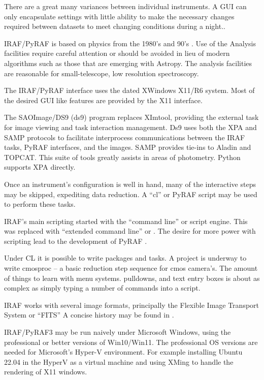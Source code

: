 There are a great many variances between individual instruments. A GUI
can only encapsulate settings with little ability to make the
necessary changes required between datasets to meet changing
conditions during a night..

IRAF/PyRAF is based on physics from the 1980's and
90's \cite{1973asqu.book.....A}. Use of the Analysis facilities require
careful attention or should be avoided in lieu of modern algorithms
such as those that are emerging with Astropy. The analysis facilities
are reasonable for small-telescope, low resolution spectroscopy.

The IRAF/PyRAF interface uses the dated XWindows X11/R6 system. Most
of the desired GUI like features are provided by the X11 interface.

The SAOImage/DS9 (ds9) %
\cite{2019zndo...2530958J} program replaces XImtool, providing the
external task for image viewing and task interaction management. Ds9
uses both the XPA and SAMP protocols to facilitate interprocess
communications between the IRAF tasks, PyRAF interfaces, and the
images. SAMP provides tie-ins to Aladin and TOPCAT. This suite of
tools greatly assists in areas of photometry.  Python supports XPA
directly.

Once an instrument's configuration is well in hand, many of the interactive
steps may be skipped, expediting data reduction. A ``cl'' or PyRAF script
may be used to perform these tasks.

IRAF's main scripting started with the ``command line'' or  script
engine. This was replaced with ``extended command line'' or .
The desire for more power with scripting lead to the development
of PyRAF \cite{2006hstc.conf..437G,PyrafProgrammersGuide}. 

Under CL it is possible to write packages and tasks. A project is underway
to write cmosproc -- a basic reduction step sequence for cmos camera's.
The amount of things to learn with menu systems. pulldowns, and text
entry boxes is about as complex as simply typing a number of commands
into a script.

IRAF works with several image formats, principally the Flexible Image
Transport System or ``FITS'' A concise history may be found in \cite{FITSBirthday}.


IRAF/PyRAF3 may be run naively under Microsoft Windows, using the
professional or better versions of Win10/Win11. The professional OS
versions are needed for Microsoft's Hyper-V environment. For example
installing Ubuntu 22.04 in the HyperV as a virtual machine and using XMing
to handle the rendering of X11 windows.

